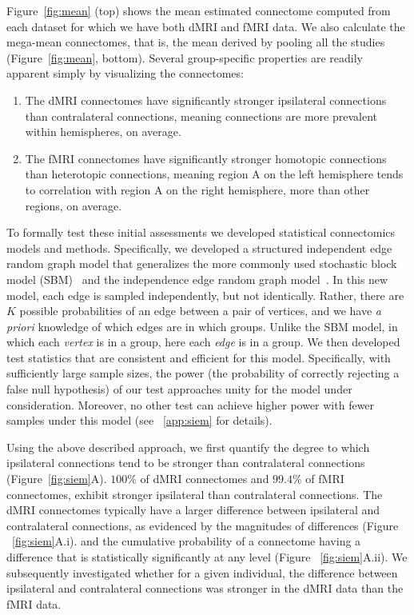 \documentclass[11pt]{article}
\begin{document}
\begin{multicols}{2}



Figure~\ref{fig:mean} (top) shows the mean estimated connectome computed from each dataset for which we have both dMRI and fMRI data.  We also calculate the  mega-mean connectomes, that is, the mean derived by pooling all the studies (Figure~\ref{fig:mean}, bottom).  Several group-specific properties are readily apparent simply by visualizing the connectomes:
\begin{enumerate}[wide, labelwidth=!, labelindent=0pt, label=\bf{\arabic*)}]
        \item The dMRI connectomes have significantly stronger ipsilateral connections than contralateral connections, meaning connections are more prevalent within hemispheres, on average.
        \item The fMRI connectomes have significantly stronger homotopic connections than heterotopic connections, meaning region A on the left hemisphere tends to correlation with region A on the right hemisphere, more than other regions, on average. 
\end{enumerate}

To formally test these initial assessments we developed statistical connectomics models and methods. Specifically, we developed a structured independent edge random graph model that generalizes the more commonly used  stochastic block model (SBM)~\cite{Holland83} and the independence edge random graph model~\cite{Bollobas2009}. In this new model, each edge is sampled independently, but not identically. Rather, there are $K$ possible probabilities of an edge between a pair of vertices, and we have \emph{a priori} knowledge of which edges are in which groups.  Unlike the SBM 
 model, in which each \emph{vertex} is in a group, here each \emph{edge} is in a group.  We then developed test statistics that are consistent and efficient for this model. Specifically, with sufficiently large sample sizes, the power (the probability of correctly rejecting a false null hypothesis) of our test approaches unity for the model under consideration.  Moreover, no other test can achieve higher power with fewer samples under this model (see ~\ref{app:siem} for details).

Using the above described approach, we first quantify the degree to which ipsilateral connections tend to be stronger than contralateral connections (Figure~\ref{fig:siem}A).   
$100\%$ of dMRI connectomes and $99.4\%$ of fMRI connectomes, exhibit stronger ipsilateral than contralateral connections.
The dMRI connectomes typically have a larger difference between ipsilateral and contralateral connections, as evidenced by the magnitudes of differences (Figure ~\ref{fig:siem}A.i). and the cumulative probability of a connectome having a difference that is statistically significantly at any level (Figure ~\ref{fig:siem}A.ii).
We subsequently investigated whether for a given individual, the difference between ipsilateral and contralateral connections was stronger in the dMRI data than the fMRI data. 


\end{multicols}
\end{document}
